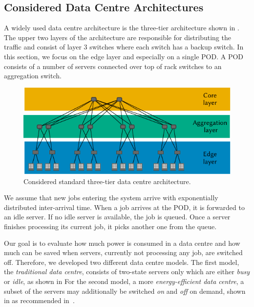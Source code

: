 \subsection{Considered Data Centre Architectures}\label{sec:cloud:data_centers:problem_formulation}

A widely used data centre architecture is the three-tier architecture shown in .
The upper two layers of the architecture are responsible for distributing the traffic and consist of layer 3 switches where each switch has a backup switch.
In this section, we focus on the edge layer and especially on a single \gls{POD}.
A \gls{POD} consists of a number of servers connected over top of rack switches to an aggregation switch.

\begin{figure}
  \centering
  \includegraphics{cloud/data_centers/problem_formulation/figures/architecture}
  \caption{Considered standard three-tier data centre architecture.}
  \label{fig:cloud:data_centers:problem_formulation:3-tier_datacenter}
\end{figure}

We assume that new jobs entering the system arrive with exponentially distributed inter-arrival time.
When a job arrives at the \gls{POD}, it is forwarded to an idle server.
If no idle server is available, the job is queued.
Once a server finishes processing its current job, it picks another one from the queue.

Our goal is to evaluate how much power is consumed in a data centre and how much can be saved when servers, currently not processing any job, are switched off.
Therefore, we developed two different data centre models.
The first model, the \emph{traditional data centre}, consists of two-state servers only which are either \emph{busy} or \emph{idle}, as shown in  
For the second model, a more \emph{energy-efficient data centre}, a subset of the servers may additionally be switched \emph{on} and \emph{off} on demand, shown in  as recommended in~\cite{EPA2007}.


